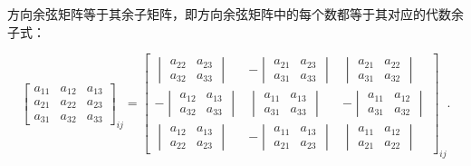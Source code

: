\begin{theorem}
方向余弦矩阵等于其余子矩阵，即方向余弦矩阵中的每个数都等于其对应的代数余子式：

\[
\begin{bmatrix}a_{11}&a_{12}&a_{13}\\a_{21}&a_{22}&a_{23}\\a_{31}&a_{32}&a_{33}\end{bmatrix}_{ij}=\left[\begin{array}{ccc}\begin{vmatrix}a_{22}&a_{23}\\a_{32}&a_{33}\end{vmatrix}&-\begin{vmatrix}a_{21}&a_{23}\\a_{31}&a_{33}\end{vmatrix}&\begin{vmatrix}a_{21}&a_{22}\\a_{31}&a_{32}\end{vmatrix}\\-\begin{vmatrix}a_{12}&a_{13}\\a_{32}&a_{33}\end{vmatrix}&\begin{vmatrix}a_{11}&a_{13}\\a_{31}&a_{33}\end{vmatrix}&-\begin{vmatrix}a_{11}&a_{12}\\a_{31}&a_{32}\end{vmatrix}\\\begin{vmatrix}a_{12}&a_{13}\\a_{22}&a_{23}\end{vmatrix}&-\begin{vmatrix}a_{11}&a_{13}\\a_{21}&a_{23}\end{vmatrix}&\begin{vmatrix}a_{11}&a_{12}\\a_{21}&a_{22}\end{vmatrix}\end{array}\right]_{ij}.
\]
\end{theorem}
